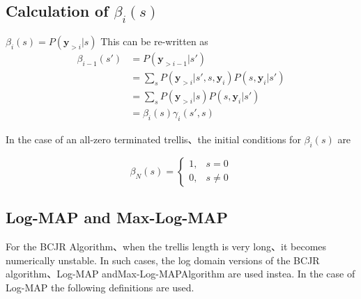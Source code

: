 \documentclass[20 pts]{article}
\begin{document}
\subsection{Calculation of $\beta_i(s)$}
$\beta_i(s)=P(\boldsymbol{y}_{>i}|s)$
This can be re-written as
\begin{equation}
\begin{split}
\beta_{i-1}(s')&=P(\boldsymbol{y}_{>i-1}|s')\\
&=\sum_{s}^{}P(\boldsymbol{y}_{>i}|s',s,\boldsymbol{y}_{i})P(s,\boldsymbol{y}_{i}|s')\\
&=\sum_{s}^{}P(\boldsymbol{y}_{>i}|s)P(s,\boldsymbol{y}_{i}|s')\\
&=\beta_i(s)\gamma_i(s',s)
\end{split}
\end{equation}

In the case of an all-zero terminated trellis、the initial conditions for $\beta_i(s)$ are

\[
    \beta_N(s)= 
\begin{cases}
   1,& s= 0\\        0,              &  s\neq 0
\end{cases}
\]
\subsection{Log-MAP and Max-Log-MAP}
For the BCJR Algorithm、when the trellis length is very long、it becomes numerically unstable. In such cases, the log domain versions of the BCJR algorithm、Log-MAP andMax-Log-MAPAlgorithm are used instea. In the case of Log-MAP the following definitions are used.
\end{document}

